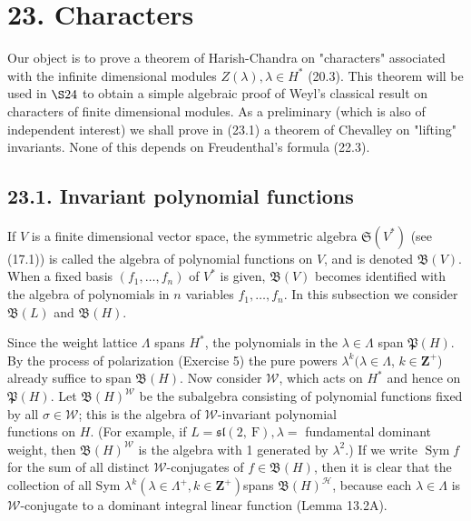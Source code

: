 \documentclass[10pt]{article}
\begin{document}
\section*{23. Characters}
Our object is to prove a theorem of Harish-Chandra on "characters" associated with the infinite dimensional modules $Z(\lambda), \lambda \in H^{*}$ (20.3). This theorem will be used in $\S 24$ to obtain a simple algebraic proof of Weyl's classical result on characters of finite dimensional modules. As a preliminary (which is also of independent interest) we shall prove in (23.1) a theorem of Chevalley on "lifting" invariants. None of this depends on Freudenthal's formula (22.3).

\subsection*{23.1. Invariant polynomial functions}
If $V$ is a finite dimensional vector space, the symmetric algebra $\mathfrak{S}\left(V^{*}\right)$ (see (17.1)) is called the algebra of polynomial functions on $V$, and is denoted $\mathfrak{B}(V)$. When a fixed basis $\left(f_{1}, \ldots, f_{n}\right)$ of $V^{*}$ is given, $\mathfrak{B}(V)$ becomes identified with the algebra of polynomials in $n$ variables $f_{1}, \ldots, f_{n}$. In this subsection we consider $\mathfrak{B}(L)$ and $\mathfrak{B}(H)$.

Since the weight lattice $\Lambda$ spans $H^{*}$, the polynomials in the $\lambda \in \Lambda$ span $\mathfrak{P}(H)$. By the process of polarization (Exercise 5) the pure powers $\lambda^{k}(\lambda \in \Lambda$, $k \in \mathbf{Z}^{+}$) already suffice to span $\mathfrak{B}(H)$. Now consider $\mathscr{W}$, which acts on $H^{*}$ and hence on $\mathfrak{P}(H)$. Let $\mathfrak{B}(H)^{\mathscr{W}}$ be the subalgebra consisting of polynomial functions fixed by all $\sigma \in \mathscr{W}$; this is the algebra of $\mathscr{W}$-invariant polynomial\\
functions on $H$. (For example, if $L=\mathfrak{s l}(2, \mathrm{~F}), \lambda=$ fundamental dominant weight, then $\mathfrak{B}(H)^{\mathscr{W}}$ is the algebra with 1 generated by $\lambda^{2}$.) If we write $\operatorname{Sym} f$ for the sum of all distinct $\mathscr{W}$-conjugates of $f \in \mathfrak{B}(H)$, then it is clear that the collection of all Sym $\lambda^{k}\left(\lambda \in \Lambda^{+}, k \in \mathbf{Z}^{+}\right)$spans $\mathfrak{B}(H)^{\mathscr{H}}$, because each $\lambda \in \Lambda$ is $\mathscr{W}$-conjugate to a dominant integral linear function (Lemma 13.2A).
\end{document}
